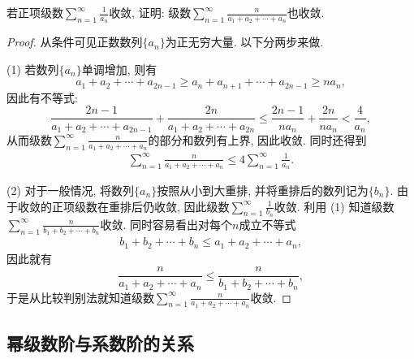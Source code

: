 \documentclass[../../main.tex]{subfiles}%
\begin{document}
\begin{example}
若正项级数$\sum\limits_{n=1}^{\infty}\frac{1}{a_n}$收敛, 证明: 级数$\sum\limits_{n=1}^{\infty}\frac{n}{a_1+a_2+\cdots+a_n}$也收敛.
\end{example}
\begin{proof}
从条件可见正数数列$\{a_n\}$为正无穷大量. 以下分两步来做.

(1) 若数列$\{a_n\}$单调增加, 则有
$$a_1+a_2+\cdots+a_{2n-1}\geqslant a_n+a_{n+1}+\cdots+a_{2n-1}\geqslant na_n,$$
因此有不等式:
$$\frac{2n-1}{a_1+a_2+\cdots+a_{2n-1}}+\frac{2n}{a_1+a_2+\cdots+a_{2n}}\leqslant \frac{2n-1}{na_n}+\frac{2n}{na_n}<\frac{4}{a_n},$$
从而级数$\sum\limits_{n=1}^{\infty}\frac{n}{a_1+a_2+\cdots+a_n}$的部分和数列有上界, 因此收敛. 同时还得到
\begin{align*}
\sum_{n=1}^{\infty}\frac{n}{a_1+a_2+\cdots+a_n}\leqslant 4\sum_{n=1}^{\infty}\frac{1}{a_n}.
\end{align*}

(2) 对于一般情况, 将数列$\{a_n\}$按照从小到大重排, 并将重排后的数列记为$\{b_n\}$. 由于收敛的正项级数在重排后仍收敛, 因此级数$\sum\limits_{n=1}^{\infty}\frac{1}{b_n}$收敛. 利用 (1) 知道级数$\sum\limits_{n=1}^{\infty}\frac{n}{b_1+b_2+\cdots+b_n}$收敛. 同时容易看出对每个$n$成立不等式
\begin{align*}
b_1+b_2+\cdots+b_n\leqslant a_1+a_2+\cdots+a_n,
\end{align*}
因此就有
$$\frac{n}{a_1+a_2+\cdots+a_n}\leqslant \frac{n}{b_1+b_2+\cdots+b_n},$$
于是从比较判别法就知道级数$\sum\limits_{n=1}^{\infty}\frac{n}{a_1+a_2+\cdots+a_n}$收敛.
\end{proof}





\subsection{幂级数阶与系数阶的关系}
\end{document}
